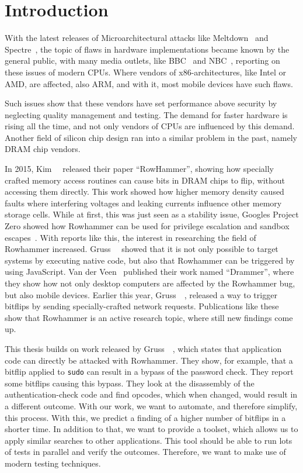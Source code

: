 \chapter{Introduction}\label{sec:intro}

With the latest releases of Microarchitectural attacks like
Meltdown~\cite{meltdown} and Spectre~\cite{spectre}, the topic of flaws in
hardware implementations became known by the general public, with many media
outlets, like BBC~\cite{bbcmeltdown} and NBC~\cite{nbcmeltdown}, reporting on
these issues of modern CPUs. Where vendors of x86-architectures, like Intel or
AMD, are affected, also ARM, and with it, most mobile devices have such flaws.

Such issues show that these vendors have set performance above security by
neglecting quality management and testing. The demand for faster hardware is
rising all the time, and not only vendors of CPUs are influenced by this demand.
Another field of silicon chip design ran into a similar problem in the past,
namely DRAM chip vendors.

In 2015, Kim~\etal~\cite{rowhammergeneral} released their paper ``RowHammer'',
showing how specially crafted memory access routines can cause bits in DRAM
chips to flip, without accessing them directly. This work showed how higher
memory density caused faults where interfering voltages and leaking currents
influence other memory storage cells. While at first, this was just seen as a
stability issue, Google\textquotesingle s Project Zero showed how Rowhammer can
be used for privilege escalation and sandbox escapes~\cite{projectzerorow}. With
reports like this, the interest in researching the field of Rowhammer increased.
Gruss~\etal~\cite{rowhammerjs} showed that it is not only possible to target
systems by executing native code, but also that Rowhammer can be triggered by
using JavaScript. Van der Veen~\etal\cite{drammer} published their work named
``Drammer'', where they show how not only desktop computers are affected by the
Rowhammer bug, but also mobile devices. Earlier this year,
Gruss~\etal~\cite{nethammer}, released a way to trigger bitflips by sending
specially-crafted network requests. Publications like these show that Rowhammer
is an active research topic, where still new findings come up.

This thesis builds on work released by Gruss~\etal~\cite{flipinthewall}, which
states that application code can directly be attacked with Rowhammer. They show,
for example, that a bitflip applied to \texttt{sudo} can result in a bypass of
the password check. They report some bitflips causing this bypass. They look at
the disassembly of the authentication-check code and find opcodes, which when
changed, would result in a different outcome. With our work, we want to
automate, and therefore simplify, this process. With this, we predict a finding
of a higher number of bitflips in a shorter time. In addition to that, we want
to provide a toolset, which allows us to apply similar searches to other
applications. This tool should be able to run lots of tests in parallel and
verify the outcomes. Therefore, we want to make use of modern testing
techniques.

